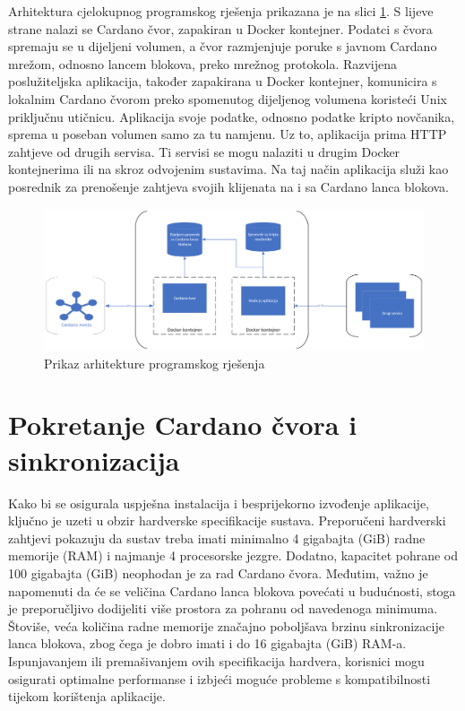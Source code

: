 \documentclass[times, utf8, diplomski]{fer}
\begin{document}
Arhitektura cjelokupnog programskog rješenja prikazana je na slici \ref{fig:arhitektura}. S lijeve strane nalazi se Cardano čvor, zapakiran u Docker kontejner. Podatci s čvora spremaju se u dijeljeni volumen, a čvor razmjenjuje poruke s javnom Cardano mrežom, odnosno lancem blokova, preko mrežnog protokola. Razvijena poslužiteljska aplikacija, također zapakirana u Docker kontejner, komunicira s lokalnim Cardano čvorom preko spomenutog dijeljenog volumena koristeći Unix priključnu utičnicu. Aplikacija svoje podatke, odnosno podatke kripto novčanika, sprema u poseban volumen samo za tu namjenu. Uz to, aplikacija prima HTTP zahtjeve od drugih servisa. Ti servisi se mogu nalaziti u drugim Docker kontejnerima ili na skroz odvojenim sustavima. Na taj način aplikacija služi kao posrednik za prenošenje zahtjeva svojih klijenata na i sa Cardano lanca blokova. 

\begin{figure}[htb]
\centering
\includegraphics[width=\linewidth]{img/cardano.png}
\caption{Prikaz arhitekture programskog rješenja}
\label{fig:arhitektura}
\end{figure}

\section{Pokretanje Cardano čvora i sinkronizacija}

Kako bi se osigurala uspješna instalacija i besprijekorno izvođenje aplikacije, ključno je uzeti u obzir hardverske specifikacije sustava. Preporučeni hardverski zahtjevi pokazuju da sustav treba imati minimalno 4 gigabajta (GiB) radne memorije (RAM) i najmanje 4 procesorske jezgre. Dodatno, kapacitet pohrane od 100 gigabajta (GiB) neophodan je za rad Cardano čvora. Međutim, važno je napomenuti da će se veličina Cardano lanca blokova povećati u budućnosti, stoga je preporučljivo dodijeliti više prostora za pohranu od navedenoga minimuma. Štoviše, veća količina radne memorije značajno poboljšava brzinu sinkronizacije lanca blokova, zbog čega je dobro imati i do 16 gigabajta (GiB) RAM-a. Ispunjavanjem ili premašivanjem ovih specifikacija hardvera, korisnici mogu osigurati optimalne performanse i izbjeći moguće probleme s kompatibilnosti tijekom korištenja aplikacije.
\end{document}
